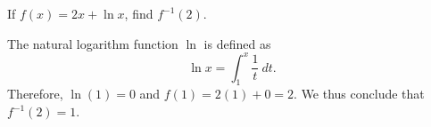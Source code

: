 \begin{exercise}
	If $f\left(x\right) = 2x + \ln x$, find $f^{-1}\left(2\right)$.
\end{exercise}
\begin{solution}
	The natural logarithm function $\ln$ is defined as
	\begin{equation}
	\label{equation-natural-logarithm}
	\ln x = \int_{1}^{x} \frac{1}{t} \ dt.
	\end{equation}
	Therefore, $\ln \left(1\right) = 0$ and $f\left(1\right) = 2\left(1\right) + 0 = 2$. We thus conclude that $f^{-1}\left(2\right) = 1$.
\end{solution}

